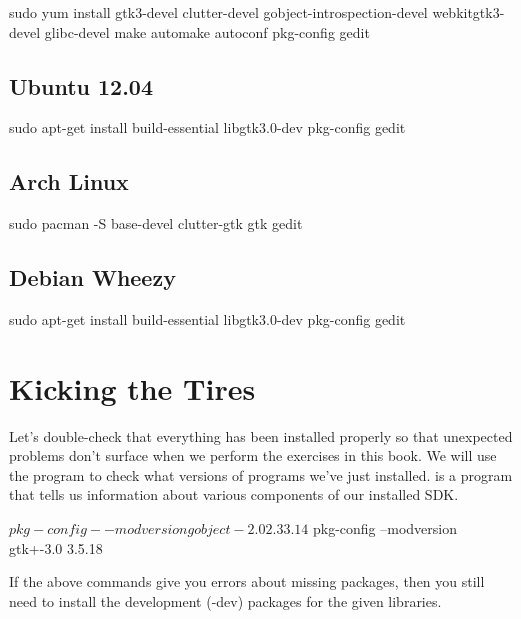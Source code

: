 \begin{Terminal}
sudo yum install gtk3-devel clutter-devel gobject-introspection-devel webkitgtk3-devel glibc-devel make automake autoconf pkg-config gedit
\end{Terminal}


\subsection{Ubuntu 12.04}

\begin{Terminal}
sudo apt-get install build-essential libgtk3.0-dev pkg-config gedit
\end{Terminal}


\subsection{Arch Linux}
\begin{Terminal}
sudo pacman -S base-devel clutter-gtk gtk gedit
\end{Terminal}

\subsection{Debian Wheezy}

\begin{Terminal}
sudo apt-get install build-essential libgtk3.0-dev pkg-config gedit
\end{Terminal}


\section{Kicking the Tires}

Let's double-check that everything has been installed properly so that 
unexpected problems don't surface when we perform the exercises in this book.
We will use the  program to check what versions of programs
we've just installed.  is a program that tells us information
about various components of our installed SDK.

\begin{Terminal}
$ pkg-config --modversion gobject-2.0
2.33.14

$ pkg-config --modversion gtk+-3.0
3.5.18
\end{Terminal}

If the above commands give you errors about missing packages, then you still
need to install the development (-dev) packages for the given libraries.
